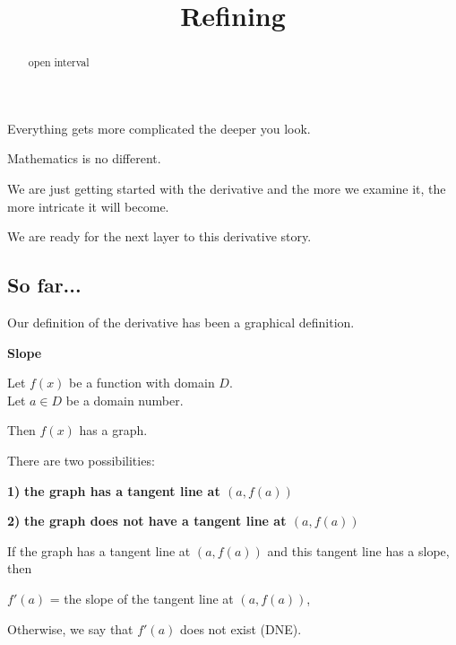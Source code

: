 \documentclass{ximera}
\title{Refining}
\begin{document}
\begin{abstract}
open interval
\end{abstract}
\maketitle



Everything gets more complicated the deeper you look. 


Mathematics is no different. 


We are just getting started with the derivative and the more we examine it, the more intricate it will become. 

We are ready for the next layer to this derivative story. 




\subsection*{So far...}


Our definition of the derivative has been a graphical definition.

\begin{idea} \textbf{\textcolor{blue!55!black}{Slope}} 

Let $f(x)$ be a function with domain $D$. \\
Let $a \in D$ be a domain number. 

Then $f(x)$ has a graph. 

There are two possibilities:  


\textbf{\textcolor{blue!55!black}{1)}} \textbf{the graph has a tangent line at $(a, f(a))$}

\textbf{\textcolor{blue!55!black}{2)}} \textbf{the graph does not have a tangent line at $(a, f(a))$}




If the graph has a tangent line at $(a, f(a))$ and this tangent line has a slope, then


\begin{center}

$f'(a)$ = the slope of the tangent line at $(a, f(a))$,

\end{center}



Otherwise, we say that $f'(a)$ does not exist (DNE).






\end{idea}
\end{document}
